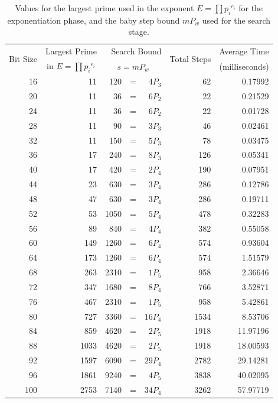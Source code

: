 \documentclass{ucalgthes1}
\theoremstyle{definition}
\begin{document}
\begin{table}[htb]
\centering
\begin{tabular}{| r | r | r r r | r | r |}
	\hline
\multirow{2}{*}{Bit Size} & Largest Prime & \multicolumn{3}{r|}{Search Bound} & \multirow{2}{*}{Total Steps} & Average Time \\
& \multicolumn{1}{c|}{in $E=\prod {p_i}^{e_i}$} & \multicolumn{3}{c|}{$s=mP_w$} & & (milliseconds) \\
	\hline
16 & 11 & 120 & = & $4P_3$ & 62 & 0.17992 \\
20 & 11 & 36 & = & $6P_2$ & 22 & 0.21529 \\
24 & 11 & 36 & = & $6P_2$ & 22 & 0.01728 \\
28 & 11 & 90 & = & $3P_3$ & 46 & 0.02461 \\
32 & 11 & 150 & = & $5P_3$ & 78 & 0.03475 \\
36 & 17 & 240 & = & $8P_3$ & 126 & 0.05341 \\
40 & 17 & 420 & = & $2P_4$ & 190 & 0.07951 \\
44 & 23 & 630 & = & $3P_4$ & 286 & 0.12786 \\
48 & 47 & 630 & = & $3P_4$ & 286 & 0.19711 \\
52 & 53 & 1050 & = & $5P_4$ & 478 & 0.32283 \\
56 & 89 & 840 & = & $4P_4$ & 382 & 0.55058 \\
60 & 149 & 1260 & = & $6P_4$ & 574 & 0.93604 \\
64 & 173 & 1260 & = & $6P_4$ & 574 & 1.51579 \\
68 & 263 & 2310 & = & $1P_5$ & 958 & 2.36646 \\
72 & 347 & 1680 & = & $8P_4$ & 766 & 3.52871 \\
76 & 467 & 2310 & = & $1P_5$ & 958 & 5.42861 \\
80 & 727 & 3360 & = & $16P_4$ & 1534 & 8.53706 \\
84 & 859 & 4620 & = & $2P_5$ & 1918 & 11.97196 \\
88 & 1033 & 4620 & = & $2P_5$ & 1918 & 18.00593 \\
92 & 1597 & 6090 & = & $29P_4$ & 2782 & 29.14281 \\
96 & 1861 & 9240 & = & $4P_5$ & 3838 & 40.02095 \\
100 & 2753 & 7140 & = & $34P_4$ & 3262 & 57.97719 \\
	\hline
\end{tabular}
\caption[SuperSPAR exponentiation and search parameters.]{Values for the largest prime used in the exponent $E = \prod {p_i}^{e_i}$ for the exponentiation phase, and the baby step bound $mP_w$ used for the search stage.}
\label{tab:ssparParams}
\end{table}
\end{document}
